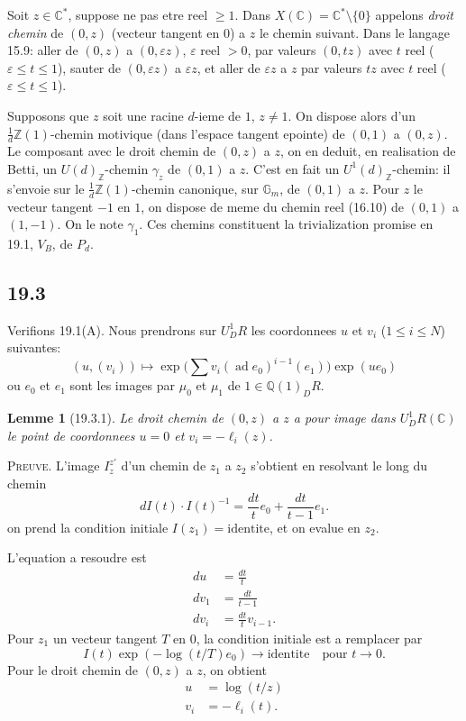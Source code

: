 \documentclass[12pt,a4paper]{article}
\theoremstyle{plain}
\newtheorem{lemma}[theorem]{Lemme}
\theoremstyle{definition}
\theoremstyle{remark}
\DeclareMathOperator{\ad}{ad}
\newcommand{\Betti}{B}
\newcommand{\dR}{DR}
\newcommand{\Gm}{\mathbb{G}_m}
\newcommand{\ZZ}{\mathbb{Z}}
\newcommand{\QQ}{\mathbb{Q}}
\newcommand{\CC}{\mathbb{C}}
\begin{document}
Soit $z \in \CC^*$, suppose ne pas etre reel $\geq 1$. Dans
$X(\CC) = \CC^* \setminus \{0\}$ appelons \textit{droit chemin} de
$(0,z)$ (vecteur tangent en $0$) a $z$ le chemin suivant. Dans le
langage 15.9: aller de $(0,z)$ a $(0,\varepsilon z)$, $\varepsilon$
reel $> 0$, par valeurs $(0,tz)$ avec $t$ reel ($\varepsilon \leq t
\leq 1$), sauter de $(0,\varepsilon z)$ a $\varepsilon z$, et aller de
$\varepsilon z$ a $z$ par valeurs $tz$ avec $t$ reel ($\varepsilon \leq t
\leq 1$).

Supposons que $z$ soit une racine $d$-ieme de $1$, $z \neq 1$. On
dispose alors d'un $\frac{1}{d}\ZZ(1)$-chemin motivique (dans l'espace
tangent epointe) de $(0,1)$ a $(0,z)$. Le composant avec le droit
chemin de $(0,z)$ a $z$, on en deduit, en realisation de Betti, un
$U(d)_\ZZ$-chemin $\gamma_z$ de $(0,1)$ a $z$. C'est en fait un
$U^1(d)_\ZZ$-chemin: il s'envoie sur le $\frac{1}{d}\ZZ(1)$-chemin
canonique, sur $\Gm$, de $(0,1)$ a $z$. Pour $z$ le vecteur tangent
$-1$ en $1$, on dispose de meme du chemin reel (16.10) de $(0,1)$ a
$(1,-1)$. On le note $\gamma_1$. Ces chemins constituent la
trivialization promise en 19.1, $V_\Betti$, de $P_d$.

\subsection{19.3}

Verifions 19.1(A). Nous prendrons sur $U^1_\dR$ les coordonnees $u$
et $v_i$ ($1 \leq i \leq N$) suivantes:
\[
(u, (v_i)) \longmapsto \exp\bigl(\sum v_i (\ad e_0)^{i-1}(e_1)\bigr) \exp(u e_0)
\]
ou $e_0$ et $e_1$ sont les images par $\mu_0$ et $\mu_1$ de $1 \in
\QQ(1)_\dR$.

\begin{lemma}[19.3.1]\label{lem:19.3.1}
Le droit chemin de $(0,z)$ a $z$ a pour image dans $U^1_\dR(\CC)$ le
point de coordonnees $u = 0$ et $v_i = -\ell_i(z)$.
\end{lemma}

\noindent \textsc{Preuve.} L'image $I_z^{z'}$ d'un chemin de $z_1$ a
$z_2$ s'obtient en resolvant le long du chemin
\[
dI(t) \cdot I(t)^{-1} = \frac{dt}{t} e_0 + \frac{dt}{t-1} e_1.
\]
on prend la condition initiale $I(z_1) = \text{identite}$, et on
evalue en $z_2$.

L'equation a resoudre est
\begin{align*}
du &= \frac{dt}{t} \\
dv_1 &= \frac{dt}{t-1} \\
dv_i &= \frac{dt}{t} v_{i-1}.
\end{align*}
Pour $z_1$ un vecteur tangent $T$ en $0$, la condition initiale est a
remplacer par
\[
I(t) \exp(-\log(t/T)e_0) \to \text{identite} \quad \text{pour } t \to 0.
\]
Pour le droit chemin de $(0,z)$ a $z$, on obtient
\begin{align*}
u &= \log(t/z) \\
v_i &= -\ell_i(t).
\end{align*}
\end{document}
